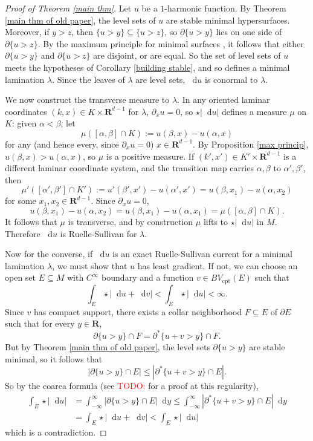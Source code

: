 \documentclass[reqno,11pt]{amsart}
\newcommand{\RR}{\mathbf{R}}
\newcommand*\dif{\mathop{}\!\mathrm{d}}
\newcommand{\cpt}{\mathrm{cpt}}
\theoremstyle{definition}
\numberwithin{equation}{section}
\newcommand\todo[1]{\textcolor{red}{TODO: #1}}
\begin{document}
\begin{proof}[Proof of Theorem \ref{main thm}]
Let $u$ be a $1$-harmonic function.
By Theorem \ref{main thm of old paper}, the level sets of $u$ are stable minimal hypersurfaces.
Moreover, if $y > z$, then $\{u > y\} \subseteq \{u > z\}$, so $\partial \{u > y\}$ lies on one side of $\partial \{u > z\}$.
By the maximum principle for minimal surfaces \cite[Corollary 1.28]{colding2011course}, it follows that either $\partial \{u > y\}$ and $\partial \{u > z\}$ are disjoint, or are equal.
So the set of level sets of $u$ meets the hypotheses of Corollary \ref{building stable}, and so defines a minimal lamination $\lambda$.
Since the leaves of $\lambda$ are level sets, $\dif u$ is conormal to $\lambda$.

We now construct the transverse measure to $\lambda$.
In any oriented laminar coordinates $(k, x) \in K \times \RR^{d - 1}$ for $\lambda$, $\partial_x u = 0$, so $\star |\dif u|$ defines a measure $\mu$ on $K$: given $\alpha < \beta$, let
$$\mu([\alpha, \beta] \cap K) := u(\beta, x) - u(\alpha, x)$$
for any (and hence every, since $\partial_x u = 0$) $x \in \RR^{d - 1}$.
By Proposition \ref{max princip}, $u(\beta, x) > u(\alpha, x)$, so $\mu$ is a positive measure.
If $(k', x') \in K' \times \RR^{d - 1}$ is a different laminar coordinate system, and the transition map carries $\alpha, \beta$ to $\alpha', \beta'$, then
$$\mu'([\alpha', \beta'] \cap K') := u'(\beta', x') - u(\alpha', x') = u(\beta, x_1) - u(\alpha, x_2)$$
for some $x_1, x_2 \in \RR^{d - 1}$. Since $\partial_x u = 0$,
$$u(\beta, x_1) - u(\alpha, x_2) = u(\beta, x_1) - u(\alpha, x_1) = \mu([\alpha, \beta] \cap K).$$
It follows that $\mu$ is transverse, and by construction $\mu$ lifts to $\star |\dif u|$ in $M$.
Therefore $\dif u$ is Ruelle-Sullivan for $\lambda$.

Now for the converse, if $\dif u$ is an exact Ruelle-Sullivan current for a minimal lamination $\lambda$, we must show that $u$ has least gradient.
If not, we can choose an open set $E \subseteq M$ with $C^\infty$ boundary and a function $v \in BV_\cpt(E)$ such that
$$\int_E \star |\dif u + \dif v| < \int_E \star |\dif u| < \infty.$$
Since $v$ has compact support, there exists a collar neighborhood $F \subseteq E$ of $\partial E$ such that for every $y \in \RR$,
$$\partial \{u > y\} \cap F = \partial^* \{u + v > y\} \cap F.$$
But by Theorem \ref{main thm of old paper}, the level sets $\partial \{u > y\}$ are stable minimal, so it follows that 
$$|\partial \{u > y\} \cap E| \leq |\partial^* \{u + v > y\} \cap E|.$$
So by the coarea formula (see \todo{\cite{BackusFLG}}  for a proof at this regularity),
\begin{align*}
\int_E \star |\dif u| &= \int_{-\infty}^\infty |\partial \{u > y\} \cap E| \dif y \leq \int_{-\infty}^\infty |\partial^* \{u + v > y\} \cap E| \dif y \\
&= \int_E \star |\dif u + \dif v| < \int_E \star |\dif u|
\end{align*}
which is a contradiction.
\end{proof}


\printbibliography
\end{document}
